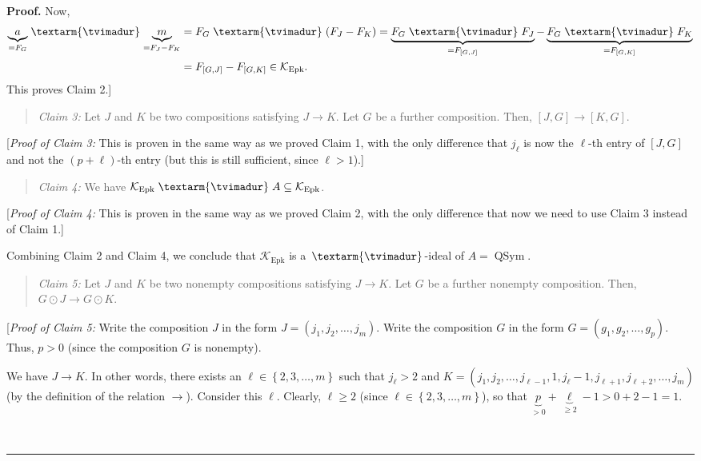 \documentclass[numbers=enddot,12pt,final,onecolumn,notitlepage]{scrartcl}%
\theoremstyle{definition}
\newenvironment{statement}{\begin{quote}}{\end{quote}}
\newenvironment{proof}[1][Proof]{\noindent\textbf{#1.} }{\ \rule{0.5em}{0.5em}}
\newenvironment{verlong}{}{}
\newcommand{\tvi}{\left. \textarm{\tvimadur} \right.}
\begin{document}
\begin{verlong}
\begin{proof}
Now,%
\begin{align*}
\underbrace{a}_{=F_{G}}\tvi \underbrace{m}_{=F_{J}-F_{K}}  &  =F_{G}%
\tvi \left(  F_{J}-F_{K}\right)  =\underbrace{F_{G}\tvi F_{J}}_{=F_{\left[
G,J\right]  }}-\underbrace{F_{G}\tvi F_{K}}_{=F_{\left[  G,K\right]  }}\\
&  =F_{\left[  G,J\right]  }-F_{\left[  G,K\right]  }\in\mathcal{K}%
_{\operatorname*{Epk}}.
\end{align*}
This proves Claim 2.]

\begin{statement}
\textit{Claim 3:} Let $J$ and $K$ be two compositions satisfying $J\rightarrow
K$. Let $G$ be a further composition. Then, $\left[  J,G\right]
\rightarrow\left[  K,G\right]  $.
\end{statement}

[\textit{Proof of Claim 3:} This is proven in the same way as we proved Claim
1, with the only difference that $j_{\ell}$ is now the $\ell$-th entry of
$\left[  J,G\right]  $ and not the $\left(  p+\ell\right)  $-th entry (but
this is still sufficient, since $\ell>1$).]

\begin{statement}
\textit{Claim 4:} We have $\mathcal{K}_{\operatorname*{Epk}}\tvi  A\subseteq
\mathcal{K}_{\operatorname*{Epk}}$.
\end{statement}

[\textit{Proof of Claim 4:} This is proven in the same way as we proved Claim
2, with the only difference that now we need to use Claim 3 instead of Claim 1.]

Combining Claim 2 and Claim 4, we conclude that $\mathcal{K}%
_{\operatorname*{Epk}}$ is a $\tvi  $-ideal of $A=\operatorname*{QSym}$.

\begin{statement}
\textit{Claim 5:} Let $J$ and $K$ be two nonempty compositions satisfying
$J\rightarrow K$. Let $G$ be a further nonempty composition. Then, $G\odot
J\rightarrow G\odot K$.
\end{statement}

[\textit{Proof of Claim 5:} Write the composition $J$ in the form $J=\left(
j_{1},j_{2},\ldots,j_{m}\right)  $. Write the composition $G$ in the form
$G=\left(  g_{1},g_{2},\ldots,g_{p}\right)  $. Thus, $p>0$ (since the
composition $G$ is nonempty).

We have $J\rightarrow K$. In other words, there exists an $\ell\in\left\{
2,3,\ldots,m\right\}  $ such that $j_{\ell}>2$ and $K=\left(  j_{1}%
,j_{2},\ldots,j_{\ell-1},1,j_{\ell}-1,j_{\ell+1},j_{\ell+2},\ldots
,j_{m}\right)  $ (by the definition of the relation $\rightarrow$). Consider
this $\ell$. Clearly, $\ell\geq2$ (since $\ell\in\left\{  2,3,\ldots
,m\right\}  $), so that $\underbrace{p}_{>0}+\underbrace{\ell}_{\geq
2}-1>0+2-1=1$.


\end{proof}
\end{verlong}
\end{document}
